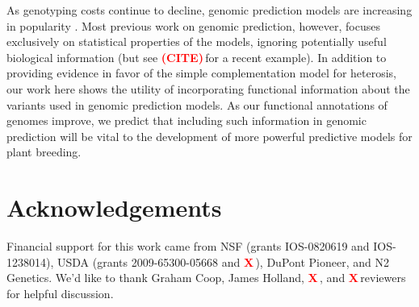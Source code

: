 \documentclass[9pt,twocolumn,twoside]{gsajnl}
\newcommand{\beginsupplement}{%
        \setcounter{table}{0}
        \renewcommand{\thetable}{S\arabic{table}}%
        \setcounter{figure}{0}
        \renewcommand{\thefigure}{S\arabic{figure}}%
     }
\newcommand{\X}{\textcolor{red}{\bf X\,}}
\newcommand{\citex}{\textcolor{red}{\bf (CITE)\,}}
\begin{document}

As genotyping costs continue to decline, genomic prediction models are increasing in popularity \citep{desta2014genomic}. 
Most previous work on genomic prediction, however, focuses exclusively on statistical properties of the models, ignoring potentially useful biological information (but see \citex for a recent example). 
In addition to providing evidence in favor of the simple complementation model for heterosis, our work here shows the utility of incorporating functional information about the variants used in genomic prediction models.  
As our functional annotations of genomes improve, we predict that including such information in genomic prediction will be vital to the development of more powerful predictive models for plant breeding.
    


\section*{Acknowledgements}
Financial support for this work came from NSF (grants IOS-0820619 and IOS-1238014), USDA (grants 2009-65300-05668 and \X), DuPont Pioneer, and N2 Genetics. We'd like to thank Graham Coop, James Holland, \X, and \X reviewers for helpful discussion. 


\clearpage




\onecolumn
\pagebreak
\beginsupplement
\end{document}
